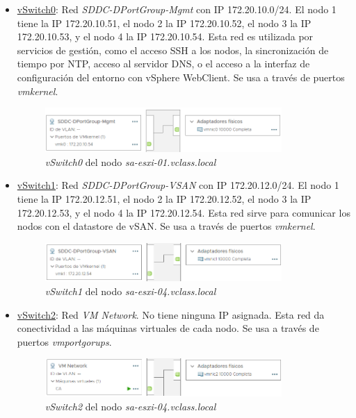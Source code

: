 \begin{itemize}
    \item \underline{vSwitch0}:
    \label{itm:managementNet}
        Red \emph{SDDC-DPortGroup-Mgmt} con IP 172.20.10.0/24.
        El nodo 1 tiene la IP 172.20.10.51, el nodo 2 la IP 172.20.10.52, el nodo 3 la IP 172.20.10.53, y el nodo 4 la IP 172.20.10.54.
        Esta red es utilizada por servicios de gestión, como el acceso SSH a los nodos, la sincronización de tiempo por NTP, acceso al servidor DNS, o el acceso a la interfaz de configuración del entorno con vSphere WebClient. Se usa a través de puertos \emph{vmkernel}.

        \begin{figure}[h!]
            \centering
            \includegraphics[width=0.85\textwidth]{imaxes/probaConcepto/vswitch0.png}
            \caption{\emph{vSwitch0} del nodo \emph{sa-esxi-01.vclass.local}} 
            \label{fig:componentesVSphere}
        \end{figure}
        \FloatBarrier
    \item \underline{vSwitch1}:
    \label{itm:vsanNet}
        Red \emph{SDDC-DPortGroup-VSAN} con IP 172.20.12.0/24.
        El nodo 1 tiene la IP 172.20.12.51, el nodo 2 la IP 172.20.12.52, el nodo 3 la IP 172.20.12.53, y el nodo 4 la IP 172.20.12.54.
        Esta red sirve para comunicar los nodos con el datastore de vSAN. Se usa a través de puertos \emph{vmkernel}.
        \begin{figure}[h!]
            \centering
            \includegraphics[width=0.85\textwidth]{imaxes/probaConcepto/vswitch1.png}
            \caption{\emph{vSwitch1} del nodo \emph{sa-esxi-04.vclass.local}} 
            \label{fig:componentesVSphere}
        \end{figure}
        \FloatBarrier
    \item \underline{vSwitch2}:
    \label{itm:machinesNet}
        Red \emph{VM Network}. No tiene ninguna IP asignada. Esta red da conectividad a las máquinas virtuales de cada nodo. Se usa a través de puertos \emph{vmportgorups}.
        \begin{figure}[h!]
            \centering
            \includegraphics[width=0.85\textwidth]{imaxes/probaConcepto/vswitch2.png}
            \caption{\emph{vSwitch2} del nodo \emph{sa-esxi-04.vclass.local}} 
            \label{fig:componentesVSphere}
        \end{figure}
        \FloatBarrier
\end{itemize}

